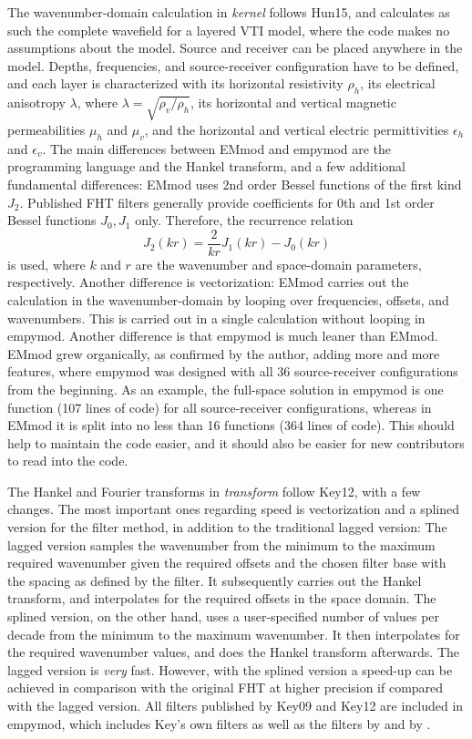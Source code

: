 \documentclass[manuscript]{geophysics}
\newcommand{\tnt}[1]{#1}
\newcommand{\emmod}{\tnt{EMmod}\xspace}
\newcommand{\empymod}{\tnt{empymod}\xspace}
\begin{document}
The wavenumber-domain calculation in \emph{kernel} follows Hun15, and
calculates as such the complete wavefield for a layered VTI model, where the
code makes no assumptions about the model. Source and receiver can be placed
anywhere in the model. Depths, frequencies, and source-receiver configuration
have to be defined, and each layer is characterized with its horizontal
resistivity $\rho_h$, its electrical anisotropy $\lambda$, where $\lambda =
\sqrt{\rho_v/\rho_h}$, its horizontal and vertical magnetic permeabilities
$\mu_h$ and $\mu_v$, and the horizontal and vertical electric permittivities
$\epsilon_h$ and $\epsilon_v$. The main differences between \emmod and \empymod
are the programming language and the Hankel transform, and a few additional
fundamental differences: \emmod uses 2nd order Bessel functions of the first
kind $J_2$. Published FHT filters generally provide coefficients for 0th and
1st order Bessel functions $J_0, J_1$ only. Therefore, the recurrence relation
%
\begin{equation}
  J_2(kr) = \frac{2}{kr}J_1(kr) - J_0(kr)
  \label{eq:j2}
\end{equation}
%
is used, where $k$ and $r$ are the wavenumber and space-domain parameters,
respectively. Another difference is vectorization: \emmod carries out the
calculation in the wavenumber-domain by looping over frequencies, offsets, and
wavenumbers. This is carried out in a single calculation without looping in
\empymod. Another difference is that \empymod is much leaner than \emmod.
\emmod grew organically, as confirmed by the author, adding more and more
features, where \empymod was designed with all 36 source-receiver
configurations from the beginning. As an example, the full-space solution in
\empymod is one function (107 lines of code) for all source-receiver
configurations, whereas in \emmod it is split into no less than 16 functions
(364 lines of code). This should help to maintain the code easier, and it
should also be easier for new contributors to read into the code.

The Hankel and Fourier transforms in \emph{transform} follow Key12, with a few
changes. The most important ones regarding speed is vectorization and a splined
version for the filter method, in addition to the traditional lagged version:
The lagged version samples the wavenumber from the minimum to the maximum
required wavenumber given the required offsets and the chosen filter base with
the spacing as defined by the filter. It subsequently carries out the Hankel
transform, and interpolates for the required offsets in the space domain. The
splined version, on the other hand, uses a user-specified number of values per
decade from the minimum to the maximum wavenumber. It then interpolates for the
required wavenumber values, and does the Hankel transform afterwards. The
lagged version is \emph{very} fast. However, with the splined version a
speed-up can be achieved in comparison with the original FHT at higher
precision if compared with the lagged version. All filters published by Key09
and Key12 are included in \empymod, which includes Key's own filters as well as
the filters by \cite{TMS.82.Anderson} and by \cite{GP.07.Kong}.
\end{document}
